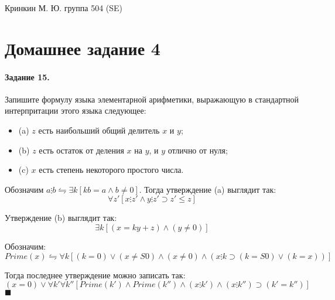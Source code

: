 \documentclass[a4paper,12pt]{article}
\begin{document}
\sloppy

\lstset{
	basicstyle=\small,
	stringstyle=\ttfamily,
	showstringspaces=false,
	columns=fixed,
	breaklines=true,
	numbers=right,
	numberstyle=\tiny
}

\newtheorem{Def}{Определение}[section]
\newtheorem{Th}{Теорема}
\newtheorem{Lem}[Th]{Лемма}
\newenvironment{Proof}
	{\par\noindent{\bf Доказательство.}}
	{\hfill$\scriptstyle\blacksquare$}
\newenvironment{Solution}
	{\par\noindent{\bf Решение.}}
	{\hfill$\scriptstyle\blacksquare$}


\begin{flushright}
	Кринкин М. Ю. группа 504 (SE)
\end{flushright}

\section{Домашнее задание 4}

\paragraph{Задание 15.} Запишите формулу языка элементарной арифметики, выражающую в стандартной интерпритации этого языка следующее:

\begin{itemize}
\item (a) $z$ есть наибольший общий делитель $x$ и $y$;

\item (b) $z$ есть остаток от деления $x$ на $y$, и $y$ отлично от нуля;

\item (c) $x$ есть степень некоторого простого числа.
\end{itemize}

\begin{Solution}
Обозначим $a \vdots b \leftrightharpoons \exists k \left[kb = a \land b \not= 0\right]$. Тогда утверждение (a) выглядит так:
\[
	\forall z' \left[x \vdots z' \land y \vdots z' \supset z' \le z\right]
\]

Утверждение (b) выглядит так:
\[
	\exists k \left[(x = ky + z) \land (y \not= 0)\right]
\]

Обозначим:
\[
	Prime\left(x\right) \leftrightharpoons \forall k\left[\left(k = 0\right)\lor\left(x\not= S0\right)\land\left(x\not= 0\right)\land\left(x\vdots k \supset \left(k=S0\right)\lor\left(k=x\right)\right)\right]
\]

Тогда последнее утверждение можно записать так:
\[
	\left(x=0\right)\lor \forall k'\forall k'' \left[Prime\left(k'\right)\land Prime\left(k''\right)\land\left(x\vdots k'\right)\land\left(x\vdots k''\right)\supset\left(k'=k''\right)\right]
\]
\end{Solution}
\end{document}
